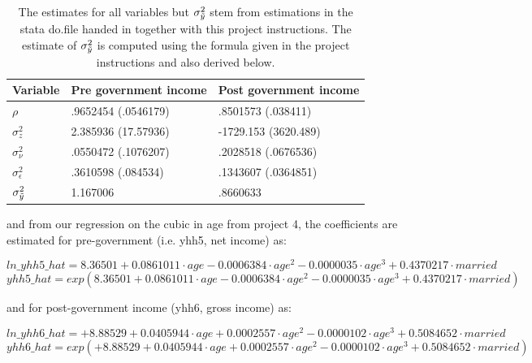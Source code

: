 \documentclass[12pt,a4paper]{article}
\begin{document}
\begin{table}[h]
\begin{tabular}{|l|l|l|}
\hline
\textbf{Variable} & \textbf{Pre government income} & \textbf{Post government income}  \\ \hline
$\rho$                        &   .9652454 (.0546179)  &  .8501573  (.038411)         \\ \hline
$\sigma^2_z$                  &   2.385936 (17.57936)  &  -1729.153 (3620.489)        \\ \hline
$\sigma^2_\nu$                &   .0550472 (.1076207)  &   .2028518 (.0676536)        \\ \hline
$\sigma^2_\epsilon$           &   .3610598  (.084534)  &   .1343607 (.0364851)        \\ \hline
$\sigma^2_{\Tilde{y}}$        &   1.167006             &   .8660633                   \\ \hline
\end{tabular}
\caption{The estimates for all variables but $\sigma^2_{\Tilde{y}}$ stem from estimations in the stata do.file handed in together with this project instructions. The estimate of $\sigma^2_{\Tilde{y}}$ is computed using the formula given in the project instructions and also derived below.}
\end{table}

and from our regression on the cubic in age from project 4, the coefficients are estimated for pre-government (i.e. yhh5, net income) as:

\begin{equation*}
    ln\_yhh5\_hat=8.36501+0.0861011\cdot age-0.0006384 \cdot age^2-0.0000035\cdot age^3+0.4370217\cdot married   
\end{equation*}
\begin{equation*}
    yhh5\_hat=exp(8.36501+0.0861011\cdot age-0.0006384 \cdot age^2-0.0000035\cdot age^3+0.4370217\cdot married)  
\end{equation*}

and for post-government income (yhh6, gross income) as:

\begin{equation*}
    ln\_yhh6\_hat=+8.88529+0.0405944\cdot age+ 0.0002557\cdot age^2-0.0000102\cdot age^3+0.5084652\cdot married  
\end{equation*}
\begin{equation*}
    yhh6\_hat=exp(+8.88529+0.0405944\cdot age+ 0.0002557\cdot age^2-0.0000102\cdot age^3+0.5084652\cdot married  )  
\end{equation*}
\end{document}

